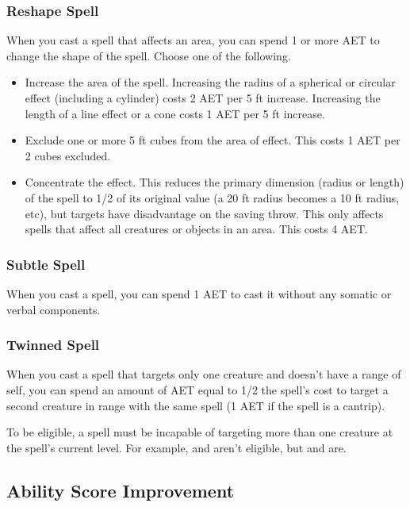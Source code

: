 \subsubsection{Reshape Spell}
When you cast a spell that affects an area, you can spend 1 or more AET to change the shape of the spell. Choose one of the following.
\begin{itemize}
  \item Increase the area of the spell. Increasing the radius of a spherical or circular effect (including a cylinder) costs 2 AET per 5 ft increase. Increasing the length of a line effect or a cone costs 1 AET per 5 ft increase.
  \item Exclude one or more 5 ft cubes from the area of effect. This costs 1 AET per 2 cubes excluded.
  \item Concentrate the effect. This reduces the primary dimension (radius or length) of the spell to 1/2 of its original value (a 20 ft radius becomes a 10 ft radius, etc), but targets have disadvantage on the saving throw. This only affects spells that affect all creatures or objects in an area. This costs 4 AET.
\end{itemize}

\subsubsection{Subtle Spell}

When you cast a spell, you can spend 1 AET to cast it without any somatic or verbal components.

\subsubsection{Twinned Spell}

When you cast a spell that targets only one creature and doesn't have a range of self, you can spend an amount of AET equal to 1/2 the spell's cost to target a second creature in range with the same spell (1 AET if the spell is a cantrip).

To be eligible, a spell must be incapable of targeting more than one creature at the spell's current level. For example,  and  aren't eligible, but  and  are.

\subsection{Ability Score Improvement}


